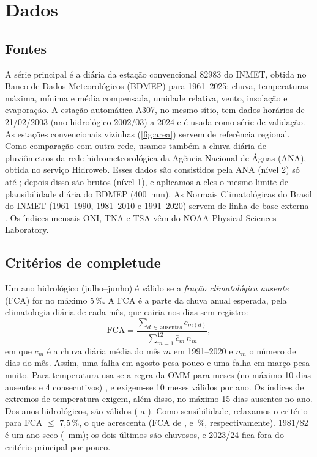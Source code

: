 \documentclass[11pt,a4paper]{article}
\newcommand{\Est}{82983}
\begin{document}
\section{Dados}\label{sec:dados}

\subsection{Fontes}
A série principal é a diária da estação convencional \Est{} do INMET, obtida no Banco de
Dados Meteorológicos (BDMEP) para 1961--2025: chuva, temperaturas máxima, mínima e média
compensada, umidade relativa, vento, insolação e evaporação. A estação automática A307, no
mesmo sítio, tem dados horários de 21/02/2003 (ano hidrológico 2002/03) a 2024 e é usada como
série de validação. As
estações convencionais vizinhas (\cref{fig:area}) servem de referência regional. Como
comparação com outra rede, usamos também a chuva diária de pluviômetros da rede hidrometeorológica
da Agência Nacional de Águas (ANA), obtida no serviço Hidroweb. Esses dados são consistidos pela ANA
(nível 2) só até \UltimoAnoConsAna{}; depois disso são brutos (nível 1), e aplicamos a eles o mesmo
limite de plausibilidade diária do BDMEP (400~mm). As Normais Climatológicas do Brasil do INMET (1961--1990,
1981--2010 e 1991--2020) servem de linha de base externa \parencite{inmet_normais}. Os índices
mensais ONI, TNA e TSA vêm do NOAA Physical Sciences Laboratory.

\subsection{Critérios de completude}
Um ano hidrológico (julho--junho) é válido se a \emph{fração climatológica ausente} (FCA)
for no máximo 5\,\%. A FCA é a parte da chuva anual esperada, pela climatologia diária de
cada mês, que cairia nos dias sem registro:
\begin{equation}
  \mathrm{FCA} = \frac{\sum_{d\,\in\,\text{ausentes}} \bar c_{m(d)}}{\sum_{m=1}^{12} \bar c_m\, n_m},
\end{equation}
em que $\bar c_m$ é a chuva diária média do mês $m$ em 1991--2020 e $n_m$ o número de dias
do mês. Assim, uma falha em agosto pesa pouco e uma falha em março pesa muito. Para
temperatura usa-se a regra da OMM para meses (no máximo 10 dias ausentes e 4 consecutivos)
\parencite{wmo2017}, e exigem-se 10 meses válidos por ano. Os índices de extremos de temperatura exigem,
além disso, no máximo 15 dias ausentes no ano. Dos \NanosHidro{} anos hidrológicos,
\NanosValidos{} são válidos (\PrimeiroAnoValido{} a \UltimoAnoValido{}). Como sensibilidade,
relaxamos o critério para FCA $\le$ 7,5\,\%, o que acrescenta \AnosFCASete{} (FCA de
\FCAumnoveoitoumoitodois{}, \FCAdoiszerodoisumdoisdois{} e \FCAdoiszerodoistresdoisquatro{}\,\%,
respectivamente). 1981/82 é um ano seco (\ChuvaObsOitentaUm{}~mm); os dois últimos são chuvosos, e
2023/24 fica fora do critério principal por pouco.
\end{document}
